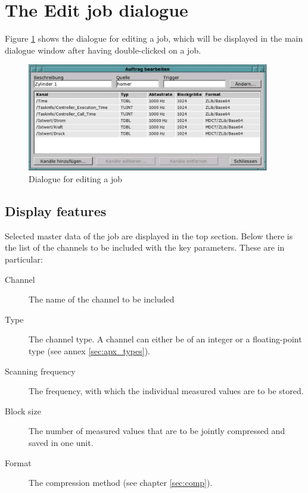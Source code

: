 \documentclass[a4paper,12pt,BCOR6mm,bibtotoc,idxtotoc]{scrbook}
\begin{document}

\section{The \glqq Edit job dialogue\grqq} \label{sec:manager_auftrag_edit}

Figure \ref{fig:dls_ctl_edit} shows the dialogue for editing a job, which will be displayed in the main dialogue window after having double-clicked on a job.

\begin{figure}[tbh] \begin{center} \includegraphics[width=300pt]{bilder/ctl_edit} \end{center} \caption{Dialogue for editing a job} \label{fig:dls_ctl_edit} \end{figure}


\subsection{Display features}

Selected master data of the job are displayed in the top section. Below there is the list of the channels to be included with the key parameters. These are in particular:

\begin{description} 
\item[Channel] The name of the channel to be included 
\item[Type] The channel type. A channel can either be of an integer or a floating-point type (see annex \ref{sec:apx_types}). 
\item[Scanning frequency] The frequency, with which the individual measured values are to be stored. 
\item[Block size] The number of measured values that are to be jointly compressed and saved in one unit. 
\item[Format] The compression method (see chapter \ref{sec:comp}). \end{description}
\end{document}
